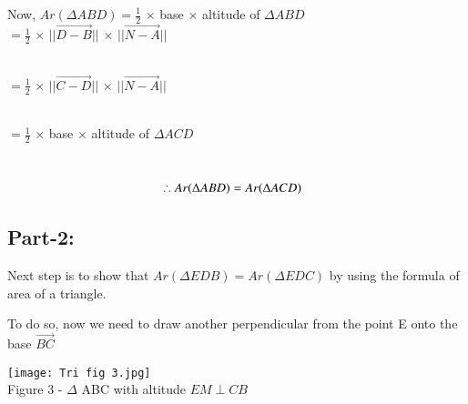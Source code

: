 \documentclass[journal,12pt,twocolumn]{IEEEtran}
\begin{document}
\hspace{0.1cm}Now, $Ar(\Delta ABD) = \frac{1}{2}$ $\times$ base $\times$ altitude of $\Delta ABD$\\
\centering
\vspace{0.25cm}
\hspace{1.6cm}$= \frac{1}{2}$ $\times$ $||{\vec{D-B}}||$ $\times$ $||{\vec{N-A}}||$\\
\vspace{0.25cm}
\
\hspace{2.9cm}\raggedright{$= \frac{1}{2}$ $\times$ $||{\vec{C-D}}||$ $\times$ $||{\vec{N-A}}||$} \vspace{0.25cm}\\
\hspace{3.5cm}{[$\because$ ${||\vec{D}-\vec{B}||}={||\vec{C}-\vec{D}||}$]}\\
\vspace{0.25cm}
\centering
\raggedright\hspace{3cm}$= \frac{1}{2}$ $\times$ base $\times$ altitude of $\Delta ACD$\\
\vspace{0.25cm}
\raggedright\hspace{2.95cm}{$=Ar(\Delta ACD)$}\\
\vspace{0.25cm}
\centering
\begin{align} 
\therefore Ar(\Delta ABD)=Ar(\Delta ACD) \hspace{0.25cm}
\label{eq:1}
\end{align}
\raggedright{\subsection{Part-2:}}

Next step is to show that $Ar(\Delta EDB)=Ar(\Delta EDC)$ by using the formula of area of a triangle.\\
\vspace{0.25cm}

To do so, now we need to draw another perpendicular from the point E onto the base $\overrightarrow{BC}$\\
\vspace{0.25cm}
\begin{center}
\texttt{[image: Tri fig 3.jpg]}\\
Figure 3 - $\Delta$ ABC with altitude ${EM} \perp {CB}$ \\
\end{center}
\end{document}

